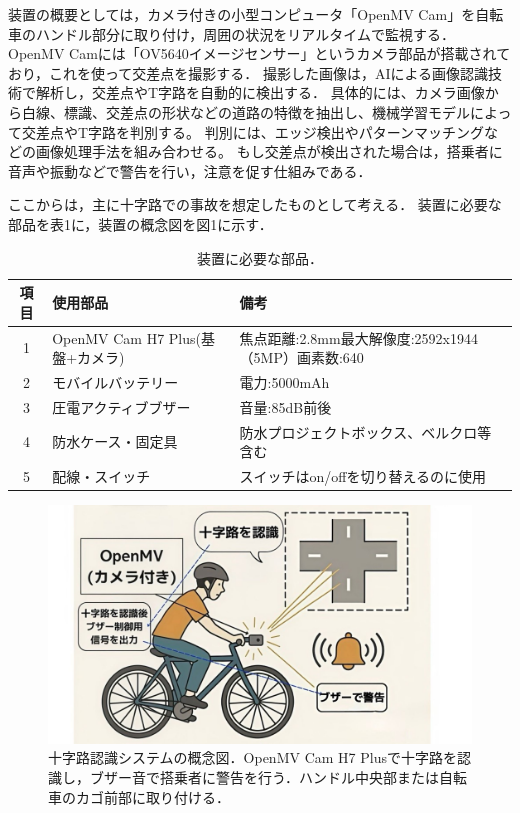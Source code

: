 \documentclass[uplatex,dvipdfmx]{jsarticle}
\begin{document}
\indent
装置の概要としては，カメラ付きの小型コンピュータ「OpenMV Cam」を自転車のハンドル部分に取り付け，周囲の状況をリアルタイムで監視する．
OpenMV Camには「OV5640イメージセンサー」というカメラ部品が搭載されており，これを使って交差点を撮影する．
撮影した画像は，AIによる画像認識技術で解析し，交差点やT字路を自動的に検出する．
具体的には、カメラ画像から白線、標識、交差点の形状などの道路の特徴を抽出し、機械学習モデルによって交差点やT字路を判別する。
判別には、エッジ検出やパターンマッチングなどの画像処理手法を組み合わせる。
もし交差点が検出された場合は，搭乗者に音声や振動などで警告を行い，注意を促す仕組みである．
\par
ここからは，主に十字路での事故を想定したものとして考える．
装置に必要な部品を表1に，装置の概念図を図1に示す．

\begin{table}[h]
  \centering
  \caption{装置に必要な部品．}
  \label{tab:parts}
  \begin{tabular}{|c|l|l|}
    \hline
    項目 & 使用部品 & 備考\\ \hline
    1 & OpenMV Cam H7 Plus(基盤+カメラ) & 焦点距離:2.8mm最大解像度:2592x1944（5MP）画素数:640\\ \hline
    2 & モバイルバッテリー & 電力:5000mAh \\ \hline
    3 & 圧電アクティブブザー & 音量:85dB前後 \\ \hline
    4 & 防水ケース・固定具 & 防水プロジェクトボックス、ベルクロ等含む \\ \hline
    5 & 配線・スイッチ & スイッチはon/offを切り替えるのに使用 \\ \hline
  \end{tabular}
\end{table}

\begin{figure}[H]
  \centering
  \includegraphics[width=14cm]{./Figs/gainenzu.jpg}
  \caption{十字路認識システムの概念図．OpenMV Cam H7 Plusで十字路を認識し，ブザー音で搭乗者に警告を行う．ハンドル中央部または自転車のカゴ前部に取り付ける．}
  \label{fig:idea}
\end{figure}
\end{document}
